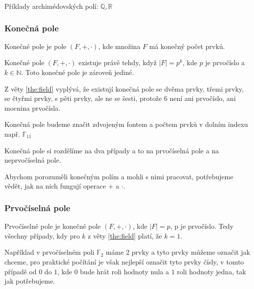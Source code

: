 Příklady archimédovských polí: $\mathbb{Q}, \mathbb{R}$

\subsubsection{Konečná pole}
\begin{definition}
    Konečné pole je pole $(F, +, \cdot)$, kde množina $F$ má konečný počet prvků.
\end{definition}
\begin{theorem}
    \label{the:field}
    Konečné pole $(F, +, \cdot)$ existuje právě tehdy, když $|F| = p^k$, kde $p$ je
    prvočíslo a $k \in \mathbb{N}$. Toto konečné pole je zároveň jediné.
\end{theorem}

Z věty \ref{the:field} vyplývá, že existují konečná pole se dvěma prvky, třemi prvky, se
čtyřmi prvky, s pěti prvky, ale ne se šesti, protože 6 není ani prvočíslo, ani mocnina prvočísla.

Konečná pole budeme značit zdvojeným fontem a počtem prvků v dolním indexu např. $\mathbb{F}_{11}$

Konečná pole si rozdělíme na dva případy a to na prvočíselná pole a na neprvočíselná pole.

Abychom porozuměli konečným polím a mohli s nimi pracovat, potřebujeme vědět,
jak na nich fungují operace $+$ a $\cdot$.

\subsubsection*{Prvočíselná pole}
\begin{definition}
    Prvočíselné pole je konečné pole $(F, +, \cdot)$, kde $|F| = p$, p je prvočíslo. Tedy
    všechny případy, kdy pro $k$ z věty \ref{the:field} platí, že $k=1$.
\end{definition}

Například v prvočíselném poli $\mathbb{F}_{2}$
máme 2 prvky a tyto prvky můžeme označit jak chceme, pro praktické počítání je však nejlepší
označit tyto prvky čísly, v tomto případě od $0$ do $1$, kde $0$ bude hrát roli hodnoty nula a
$1$ roli hodnoty jedna, tak jak potřebujeme.

